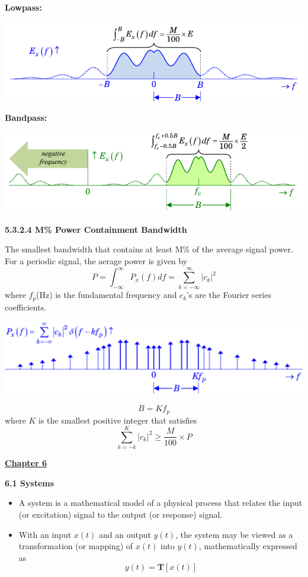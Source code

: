\documentclass[landscape,a4paper]{extarticle}
\newenvironment{Figure}
  {\par\medskip\noindent\minipage{\linewidth}}
  {\endminipage\par\medskip}
\begin{document}
\begin{multicols*}{5}
    \textbf{Lowpass:}
    \begin{Figure}
        \centering
        \includegraphics[width=\linewidth]{MPercentEnergy_lowpass.png}
    \end{Figure}
    \textbf{Bandpass:}
    \begin{Figure}
        \centering
        \includegraphics[width=\linewidth]{MPercentEnergy_bandpass.png}
    \end{Figure}

    \textbf{5.3.2.4 M\% Power Containment Bandwidth}

    The smallest bandwidth that contains at least M\% of the average signal power. For a periodic signal, the aerage power is given by
    \[
        P = \int_{-\infty}^{\infty}P_x(f)df=\sum_{k=-\infty}^{\infty}|c_k|^2
    \]
    where $f_p$(Hz) is the fundamental frequency and $c_k$'s are the Fourier series coefficients.
    \begin{Figure}
        \centering
        \includegraphics[width=\linewidth]{MPercentPower.png}
    \end{Figure}
    \[
        B = Kf_p
    \]
    where $K$ is the smallest positive integer that satisfies 
    \[
        \sum_{k=-k}^{K}|c_k|^2 \geq \frac{M}{100} \times P
    \]

    \textbf{\uline{Chapter 6}}

    \textbf{6.1 Systems}

    \begin{itemize}
        \item A system is a mathematical model of a physical process that relates the input (or excitation) signal to the output (or response) signal.
        \item With an input $x(t)$ and an output $y(t)$, the system may be viewed as a transformation (or mapping) of $x(t)$ into $y(t)$, mathematically expressed as 
        \[
            y(t) = \textbf{T}\left[x(t)\right] \tag{6.1}
        \]
    \end{itemize}


\end{multicols*}
\end{document}
